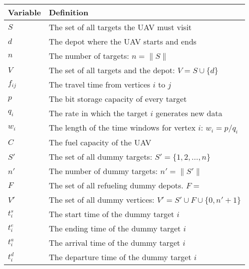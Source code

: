 
\begin{table}[htbp]
\caption{}
\begin{center}
\begin{tabular}{l l}
Variable & Definition \\
\hline
$S$      & The set of all targets the UAV must visit  \\
$d$      & The depot where the UAV starts and ends \\
$n$      & The number of targets: $n=\|S\|$ \\
$V$      & The set of all targets and the depot: $V=S\cup\{d\}$ \\
$f_{ij}$ & The travel time from vertices $i$ to $j$ \\
$p$      & The bit storage capacity of every target \\
$q_i$    & The rate in which the target $i$ generates new data \\
$w_i$    & The length of the time windows for vertex $i$: $w_i=p/q_i$ \\
$C$      & The fuel capacity of the UAV \\
\hline
$S'$     & The set of all dummy targets: $S'=\{1,2,...,n\}$ \\
$n'$     & The number of dummy targets: $n'=\|S'\|$ \\
$F$      & The set of all refueling dummy depots. $F={}$\\
$V'$     & The set of all dummy vertices: $V'=S'\cup F\cup\{0,n'+1\}$ \\
$t^s_i$  & The start time of the dummy target $i$ \\
$t^e_i$  & The ending time of the dummy target $i$ \\
\hline
$t^a_i$  & The arrival time of the dummy target $i$ \\
$t^d_i$  & The departure time of the dummy target $i$ \\
\hline
\end{tabular}
\label{tab:vars}
\end{center}
\end{table}
